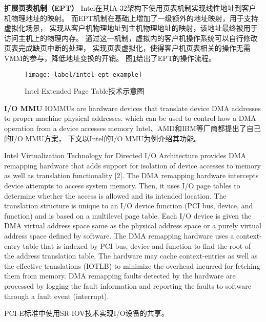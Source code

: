 \textbf{扩展页表机制（EPT）}\quad
Intel在其IA-32架构下使用页表机制实现线性地址到客户机物理地址的映射。
而EPT机制在基础上增加了一级额外的地址映射，用于支持虚拟化场景，
实现从客户机物理地址到主机物理地址的映射，该地址最终被用于访问主机上的物理内存。
通过这一机制，虚拟内的客户机操作系统可以自行修改页表完成缺页中断的处理，
实现页表虚拟化，使得客户机页表相关的操作无需VMM的参与，降低地址变换的开销。
图\ref{fig:intel-ept-example}给出了EPT的操作流程。

\begin{figure}[H]
  \centering
  \texttt{[image: label/intel-ept-example]}
  \caption[Intel Extended Page Table技术示意图]{
    Intel Extended Page Table技术示意图}
  \label{fig:intel-ept-example}
\end{figure}

\textbf{I/O MMU}\quad
IOMMUs are hardware devices that translate
device DMA addresses to proper machine
physical addresses.
which can be used to control how a DMA operation
from a device accesses memory
Intel、AMD和IBM等厂商都提出了自己的I/O MMU方案\cite{intel-iommu, amd-iommu, ibm-iommu}，
下文以Intel的I/O MMU为例介绍其功能。

Intel Virtualization Technology for Directed
I/O Architecture provides DMA remapping
hardware that adds support for isolation of device
accesses to memory as well as translation
functionality [2]. The DMA remapping hardware
intercepts device attempts to access system
memory. Then, it uses I/O page tables to
determine whether the access is allowed and
its intended location. The translation structure
is unique to an I/O device function (PCI bus,
device, and function) and is based on a multilevel
page table. Each I/O device is given the
DMA virtual address space same as the physical
address space or a purely virtual address
space defined by software. The DMA remapping
hardware uses a context-entry table that is
indexed by PCI bus, device and function to find
the root of the address translation table. The
hardware may cache context-entries as well as
the effective translations (IOTLB) to minimize
the overhead incurred for fetching them from
memory. DMA remapping faults detected by
the hardware are processed by logging the fault
information and reporting the faults to software
through a fault event (interrupt).



PCI-E标准中使用SR-IOV技术实现I/O设备的共享。

